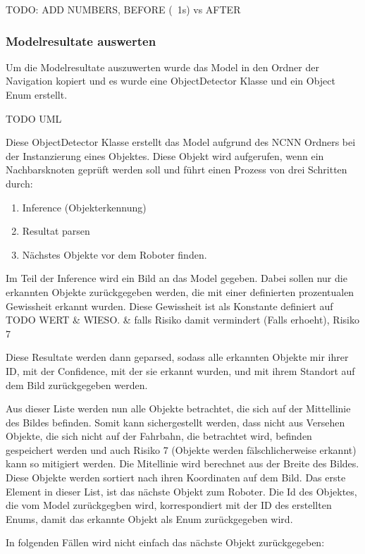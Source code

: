 TODO: ADD NUMBERS, BEFORE (~1s) vs AFTER

\subsubsection{Modelresultate auswerten}
\label{model-results}

Um die Modelresultate auszuwerten wurde das Model in den Ordner der Navigation kopiert und es wurde eine ObjectDetector Klasse und ein Object Enum erstellt.

TODO UML

Diese ObjectDetector Klasse erstellt das Model aufgrund des NCNN Ordners bei der Instanzierung eines Objektes. Diese Objekt wird aufgerufen, wenn ein Nachbarsknoten geprüft werden soll und führt einen Prozess von drei Schritten durch:

\begin{enumerate}
    \item Inference (Objekterkennung)
    \item Resultat parsen
    \item Nächstes Objekte vor dem Roboter finden.
\end{enumerate}

Im Teil der Inference wird ein Bild an das Model gegeben. Dabei sollen nur die erkannten Objekte zurückgegeben werden, die mit einer definierten prozentualen Gewissheit erkannt wurden. Diese Gewissheit ist als Konstante definiert auf TODO WERT \& WIESO. \& falls Risiko damit vermindert (Falls erhoeht), Risiko 7

Diese Resultate werden dann geparsed, sodass alle erkannten Objekte mir ihrer ID, mit der Confidence, mit der sie erkannt wurden, und mit ihrem Standort auf dem Bild zurückgegeben werden.

Aus dieser Liste werden nun alle Objekte betrachtet, die sich auf der Mittellinie des Bildes befinden. Somit kann sichergestellt werden, dass nicht aus Versehen Objekte, die sich nicht auf der Fahrbahn, die betrachtet wird, befinden gespeichert werden und auch Risiko 7 (Objekte werden fälschlicherweise erkannt) kann so mitigiert werden. Die Mitellinie wird berechnet aus der Breite des Bildes. Diese Objekte werden sortiert nach ihren Koordinaten auf dem Bild. Das erste Element in dieser List, ist das nächste Objekt zum Roboter. Die Id des Objektes, die vom Model zurückgegben wird, korrespondiert mit der ID des erstellten Enums, damit das erkannte Objekt als Enum zurückgegeben wird.

In folgenden Fällen wird nicht einfach das nächste Objekt zurückgegeben:

